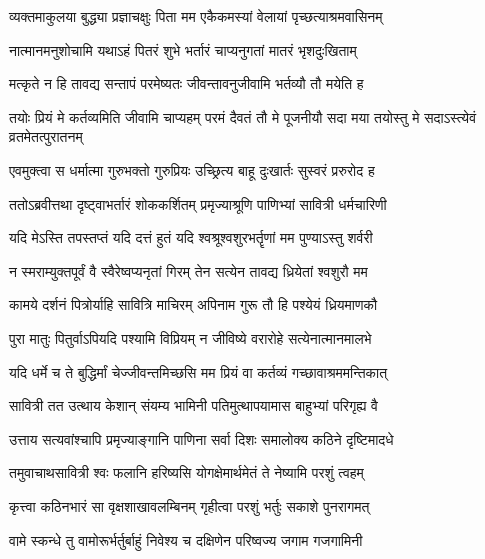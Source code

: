 \twolineshloka
{व्यक्तमाकुलया बुद्ध्या प्रज्ञाचक्षुः पिता मम}
{एकैकमस्यां वेलायां पृच्छत्याश्रमवासिनम्}


\twolineshloka
{नात्मानमनुशोचामि यथाऽहं पितरं शुभे}
{भर्तारं चाप्यनुगतां मातरं भृशदुःखिताम्}


\twolineshloka
{मत्कृते न हि तावद्य सन्तापं परमेष्यतः}
{जीवन्तावनुजीवामि भर्तव्यौ तौ मयेति ह}


\threelineshloka
{तयोः प्रियं मे कर्तव्यमिति जीवामि चाप्यहम्}
{परमं दैवतं तौ मे पूजनीयौ सदा मया}
{तयोस्तु मे सदाऽस्त्येवं  व्रतमेतत्पुरातनम्}




\twolineshloka
{एवमुक्त्वा स धर्मात्मा गुरुभक्तो गुरुप्रियः}
{उच्छ्रित्य बाहू दुःखार्तः सुस्वरं प्ररुरोद ह}


\twolineshloka
{ततोऽब्रवीत्तथा दृष्ट्वाभर्तारं शोककर्शितम्}
{प्रमृज्याश्रूणि पाणिभ्यां सावित्री धर्मचारिणी}


\twolineshloka
{यदि मेऽस्ति तपस्तप्तं यदि दत्तं हुतं यदि}
{श्वश्रूश्वशुरभर्तॄणां मम पुण्याऽस्तु शर्वरी}


\twolineshloka
{न स्मराम्युक्तपूर्वं वै स्वैरेष्वप्यनृतां गिरम्}
{तेन सत्येन तावद्य ध्रियेतां श्वशुरौ मम}




\twolineshloka
{कामये दर्शनं पित्रोर्याहि सावित्रि माचिरम्}
{अपिनाम गुरू तौ हि  पश्येयं ध्रियमाणकौ}


\twolineshloka
{पुरा मातुः पितुर्वाऽपियदि पश्यामि विप्रियम्}
{न जीविष्ये वरारोहे सत्येनात्मानमालभे}


\twolineshloka
{यदि धर्मे च ते बुद्धिर्मां चेज्जीवन्तमिच्छसि}
{मम प्रियं वा कर्तव्यं गच्छावाश्रममन्तिकात्}




\twolineshloka
{सावित्री तत उत्थाय केशान् संयम्य भामिनी}
{पतिमुत्थापयामास बाहुभ्यां परिगृह्य वै}


\twolineshloka
{उत्ताय सत्यवांश्चापि प्रमृज्याङ्गानि पाणिना}
{सर्वा दिशः समालोक्य कठिने दृष्टिमादधे}


\twolineshloka
{तमुवाचाथसावित्री श्वः फलानि हरिष्यसि}
{योगक्षेमार्थमेतं ते नेष्यामि परशुं त्वहम्}


\twolineshloka
{कृत्त्वा कठिनभारं सा वृक्षशाखावलम्बिनम्}
{गृहीत्वा परशुं भर्तुः सकाशे पुनरागमत्}


\twolineshloka
{वामे स्कन्धे तु वामोरूर्भर्तुर्बाहुं निवेश्य च}
{दक्षिणेन परिष्वज्य जगाम गजगामिनी}

